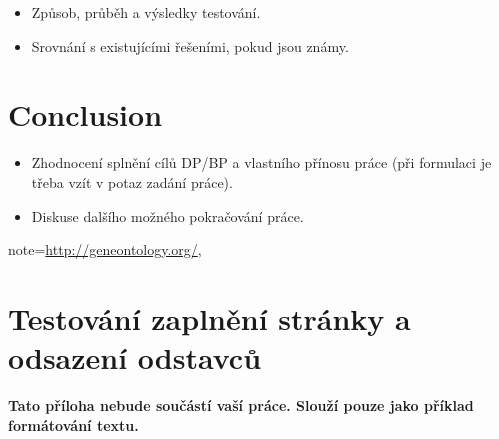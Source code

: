 \documentclass[11pt,twoside,a4paper]{book}
\begin{document}
\begin{itemize}
 \item Způsob, průběh a výsledky testování.
 \item Srovnání s existujícími řešeními, pokud jsou známy.
\end{itemize} 


\chapter{Conclusion}

\begin{itemize}
\item Zhodnocení splnění cílů DP/BP a  vlastního přínosu práce (při formulaci je třeba vzít v potaz zadání práce).
\item Diskuse dalšího možného pokračování práce.\end{itemize}   note={\url{http://geneontology.org/}},



%

%
%
{
\def\CS{$\cal C\kern-0.1667em\lower.5ex\hbox{$\cal S$}\kern-0.075em $}

}

%

\appendix

\chapter{Testování zaplnění stránky a odsazení odstavců}
\textbf{\large Tato příloha nebude součástí vaší práce. 
Slouží pouze jako příklad formátování textu.}
\end{document}
